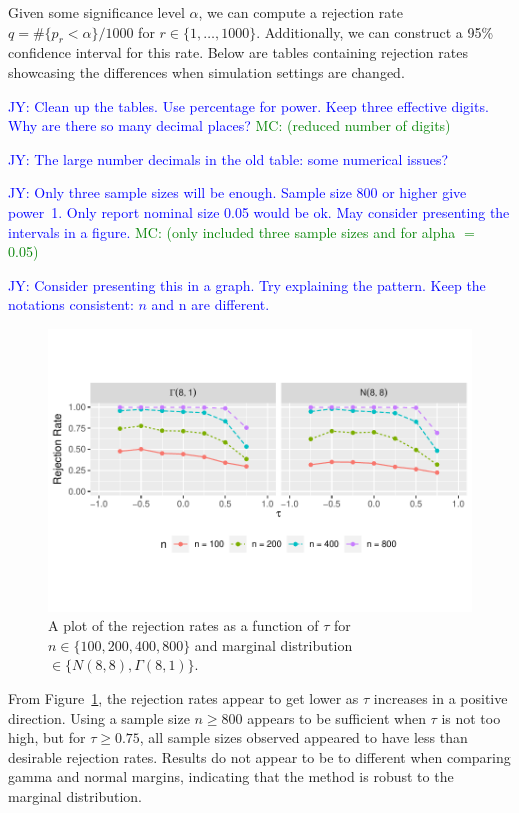 \documentclass[12pt, titlepage, letterpaper]{article}
\newcommand{\jy}[1]{\textcolor{blue}{JY: #1}}
\newcommand{\mc}[1]{\textcolor{green}{MC: (#1)}}
\begin{document}
{Given some significance level $\alpha$, we can compute a rejection rate 
$q = \#\{p_r < \alpha\} / 1000$ for $r \in \{1, \ldots, 1000\}$.
Additionally, we can construct a 95\% confidence interval for 
this rate. Below are tables containing rejection rates showcasing the 
differences when simulation settings are changed.

\jy{Clean up the tables. Use percentage for power. Keep three effective
  digits. Why are there so many decimal places? }
\mc{reduced number of digits}

\jy{The large number decimals in the old table: some numerical issues?}

\jy{Only three sample sizes will be enough. Sample size 800 or higher give
  power~1. Only report nominal size 0.05 would be ok. May consider presenting
  the intervals in a figure.}
\mc{only included three sample sizes and for alpha $=$ 0.05}


\jy{Consider presenting this in a graph. Try explaining the pattern.
  Keep the notations consistent: $n$ and n are different.}


\begin{figure}[tbp]
  \centering
  \includegraphics[scale=1]{figures/rr}
  \caption{A plot of the rejection rates as a function of $\tau$ for
 $n \in \{100, 200, 400, 800\}$ and marginal distribution 
 $\in \{N(8,8), \Gamma(8,1)\}$.}
  \label{fig:rr}
\end{figure}


From 
Figure~\ref{fig:rr}, 
the rejection rates appear to get lower as $\tau$ increases in a
positive direction. Using a sample size $n \geq 800$ appears to be sufficient
when $\tau$ is not too high, but for $\tau \geq 0.75$, all sample sizes 
observed appeared to have less than desirable rejection rates. Results
do not appear to be to different when comparing gamma and normal 
margins, indicating that the method is robust to the marginal distribution.


}
\end{document}
